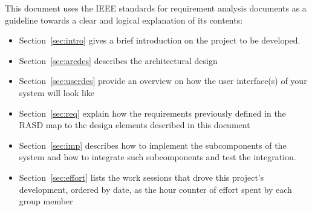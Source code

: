 \documentclass[../DD0.tex]{subfiles}
\begin{document}
  This document uses the IEEE standards for requirement analysis documents \cite{ieee830} as a guideline towards a clear and logical explanation of its contents:
  \begin{itemize}
    \item Section~\ref{sec:intro} gives a brief introduction on the project to be developed.
    \item Section~\ref{sec:arcdes} describes the architectural design
    \item Section~\ref{sec:userdes} provide an overview on how the user interface(s) of your system will look like
    \item Section~\ref{sec:req} explain how the requirements previously defined in the RASD map to the design elements described in this document
    \item Section~\ref{sec:imp} describes how to implement the subcomponents of the system and how to integrate such subcomponents and test the integration.
    \item Section~\ref{sec:effort} lists the work sessions that drove this project's development, ordered by date, as the hour counter of effort spent by each group member
  \end{itemize}
\end{document}
